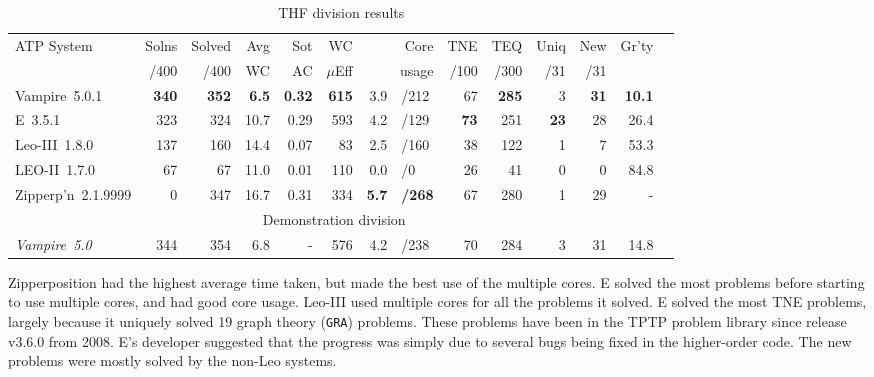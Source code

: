 \documentclass[aic]{iosart2x}
\newcommand{\smalltt}[1]{\small \texttt{#1}}
\newcommand{\bb}[1]{\bf {#1}}
\begin{document}
\begin{table}[tbh]
\caption{THF division results}
\label{THFSummary}
\begin{tabular}{lrrrrrr@{}l@{}rrrrrr}
\hline
ATP System             & Solns & Solved & Avg  & Sot  & WC       & \multicolumn{2}{r}{Core} & TNE & TEQ &Uniq & New & Gr'ty \\
                       & /400  & /400   & WC   & AC   & $\mu$Eff & \multicolumn{2}{r}{usage}&/100 &/300 & /31 & /31 &       \\
\hline
Vampire~5.0.1          &  \bb{340}  &  \bb{352}   &  \bb{6.5} & \bb{0.32} & \bb{615}      & 3.9       & {\tiny /212} &  67 & \bb{285} &   3 &  \bb{31} & \bb{10.1}  \\
E~3.5.1                &  323  &  324   & 10.7 & 0.29 & 593      & 4.2       & {\tiny /129} &  \bb{73} & 251 &  \bb{23} &  28 & 26.4  \\
Leo-III~1.8.0          &  137  &  160   & 14.4 & 0.07 &  83      & 2.5       & {\tiny /160} &  38 & 122 &   1 &   7 & 53.3  \\
LEO-II~1.7.0           &   67  &   67   & 11.0 & 0.01 & 110      & 0.0       & {\tiny /0  } &  26 &  41 &   0 &   0 & 84.8  \\
Zipperp'n~2.1.9999     &    0  &  347   & 16.7 & 0.31 & 334      & \bb{5.7}       & {\tiny \bb{/268}} &  67 & 280 &   1 &  29 &    -  \\
\hline
\multicolumn{13}{c}{Demonstration division} \\
\hline
\textit{Vampire~5.0}   &  344  &  354   &  6.8 &    - & 576      & 4.2       & {\tiny /238} &  70 & 284 &   3 &  31 & 14.8  \\
\hline
\end{tabular}
\end{table}

Zipperposition had the highest average time taken, but made the best use of the multiple cores.
E solved the most problems before starting to use multiple cores, and had good core usage.
Leo-III used multiple cores for all the problems it solved.
E solved the most TNE problems, largely because it uniquely solved 19 graph theory 
(\smalltt{GRA}) problems.
These problems have been in the TPTP problem library since release v3.6.0 from 2008.
E's developer suggested that the progress was simply due to several bugs being fixed in the 
higher-order code.
The new problems were mostly solved by the non-Leo systems.
\end{document}
